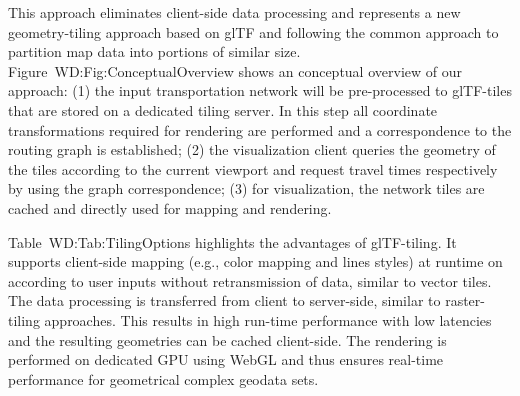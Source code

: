       This approach eliminates client-side data processing and represents a new geometry-tiling
      approach based on glTF and following the common approach to partition map data
      into portions of similar size. Figure~{WD:Fig:ConceptualOverview} shows an conceptual
      overview of our approach: (1) the input transportation network will be pre-processed
      to glTF-tiles that are stored on a dedicated tiling server. In this step all
      coordinate transformations required for rendering are performed and a correspondence
      to the routing graph is established; (2) the visualization client queries the
      geometry of the tiles according to the current viewport and request travel times
      respectively by using the graph correspondence; (3) for visualization, the network
      tiles are cached and directly used for mapping and rendering.\par
      Table~{WD:Tab:TilingOptions} highlights the advantages of glTF-tiling. It
      supports client-side mapping (e.g., color mapping and lines styles) at runtime
      on according to user inputs without retransmission of data, similar to vector
      tiles. The data processing is transferred from client to server-side, similar
      to raster-tiling approaches. This results in high run-time performance with
      low latencies and the resulting geometries can be cached client-side. The
      rendering is performed on dedicated GPU using WebGL and thus ensures real-time
      performance for geometrical complex geodata sets.\par


